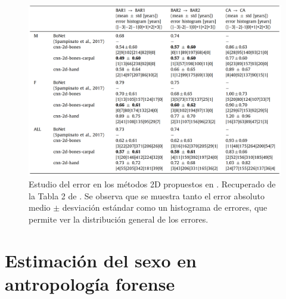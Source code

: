 \begin{figure}[h]
    \centering
    \includegraphics[width=\textwidth]{capitulos/cap_03/imagenes/error_study.png}
    \caption[
        Estudio del error en los métodos 2D propuestos en \cite{stern2019}.
    ]{
        Estudio del error en los métodos 2D propuestos en \cite{stern2019}. 
        Recuperado de la Tabla 2 de \cite{stern2019}. 
        Se observa que se muestra tanto el error absoluto medio $\pm$ desviación estándar como un histograma de errores, que permite ver la distribución general de los errores. 
    }
    \label{fig:error_study_stern2019}
\end{figure}



\section{Estimación del sexo en antropología forense}










